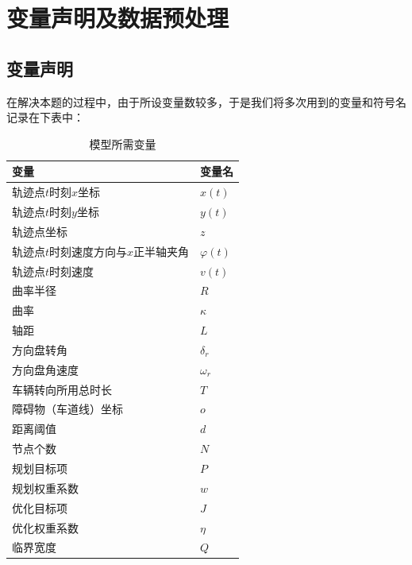 \documentclass{article}
\begin{document}
	\section{变量声明及数据预处理}
	\subsection{变量声明}
	在解决本题的过程中，由于所设变量数较多，于是我们将多次用到的变量和符号名记录在下表中：
	\begin{table}[!h]
		\centering
		\caption{模型所需变量}
		\begin{tabular}{|l|l|}
			\hline
			变量 & 变量名 \\
			\hline
			轨迹点$t$时刻$x$坐标& $x(t)$\\
			轨迹点$t$时刻$y$坐标& $y(t)$\\
			轨迹点坐标&$z$\\
			轨迹点$t$时刻速度方向与$x$正半轴夹角& $\varphi(t)$\\
			轨迹点$t$时刻速度& $v(t)$\\
			曲率半径&$R$\\
			曲率 &$\kappa$\\
			轴距 &$L$\\
			方向盘转角&$\delta_r$\\
			方向盘角速度&$\omega_r$\\
			车辆转向所用总时长 &$T$\\
			障碍物（车道线）坐标 &$o$\\
			距离阈值 &$d$\\
			节点个数 &$N$\\
			规划目标项 &$P$\\
			规划权重系数 &$w$\\
			优化目标项 &$J$\\
			优化权重系数 &$\eta$\\
			临界宽度 &$Q$\\
			\hline
		\end{tabular}
	\end{table}

	\newpage
\end{document}
